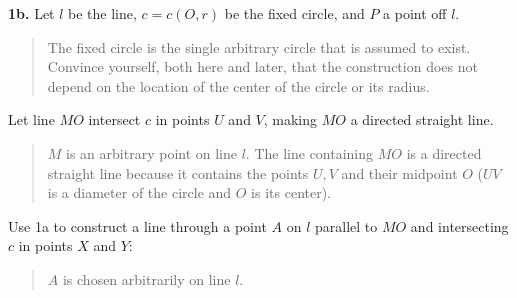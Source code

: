 \textbf{1b.} Let $l$ be the line, $c = c(O,r)$ be the fixed circle, and $P$ a point off $l$.
\begin{quote}
\vspace*{-10pt}
The fixed circle is the single arbitrary circle that is assumed to exist. Convince yourself, both here and later, that the construction does not depend on the location of the center of the circle or its radius.
\end{quote}
\begin{center}
\vspace*{-16pt}
\end{center}
Let line $MO$ intersect $c$ in points $U$ and $V$, making $MO$ a directed straight line.
\begin{quote}
\vspace*{-10pt}
$M$ is an arbitrary point on line $l$. The line containing $MO$ is a directed straight line because it contains the points $U,V$ and their midpoint $O$ ($UV$ is a diameter of the circle and $O$ is its center).
\vspace*{-10pt}
\end{quote}
Use 1a to construct a line through a point $A$ on $l$ parallel to $MO$ and intersecting $c$ in points $X$ and $Y$:
\begin{quote}
\vspace*{-10pt}
$A$ is chosen arbitrarily on line $l$.
\vspace*{-10pt}
\end{quote}
